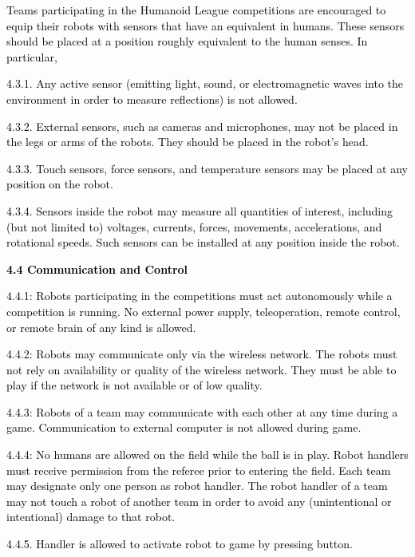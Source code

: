 \documentclass[a4paper]{article}
\begin{document}
\textcolor{black}{Teams participating in the Humanoid League competitions are encouraged to equip their robots with
sensors that have an equivalent in humans. These sensors should be placed at a position roughly equivalent to the human
senses. In particular,}

\textcolor{black}{4.3.1. Any active sensor (emitting light, sound, or electromagnetic waves into the environment in
order to measure reflections) is not allowed.}

\textcolor{black}{4.3.2. External sensors, such as cameras and microphones, may not be placed in the legs or arms of the
robots. They should be placed in the robot's head.}

\textcolor{black}{4.3.3. Touch sensors, force sensors, and temperature sensors may be placed at any position on the
robot.}

\textcolor{black}{4.3.4. Sensors inside the robot may measure all quantities of interest, including (but not limited to)
voltages, currents, forces, movements, accelerations, and rotational speeds. Such sensors can be installed at any
position inside the robot.}


\bigskip

\textbf{\textcolor{black}{4.4 Communication and Control}}


\bigskip

\textcolor{black}{4.4.1: Robots participating in the competitions must act autonomously while a competition is running.
No external power supply, teleoperation, remote control, or remote brain of any kind is allowed.}

\textcolor{black}{4.4.2: Robots may communicate only via the wireless network. The robots must not rely on availability
or quality of the wireless network. They must be able to play if the network is not available or of low quality.}

\textcolor{black}{4.4.3: Robots of a team may communicate with each other at any time during a game. Communication to
external computer is not allowed during game.}

\textcolor{black}{4.4.4: No humans are allowed on the field while the ball is in play. Robot handlers must receive
permission from the referee prior to entering the field. Each team may designate }\textcolor{black}{only one person as
robot handler. The robot handler of a team may not touch a robot of another team in order to avoid any (unintentional
or intentional) damage to that robot.}

\textcolor{black}{4.4.5. Handler is allowed to activate robot to game by pressing button.}
\end{document}

